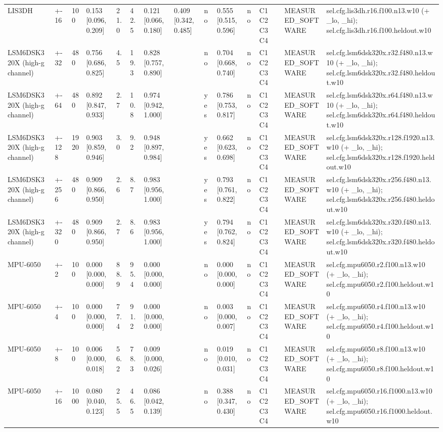 \begin{table}[t]
\begin{tabular}{llllllllllllll}
LIS3DH & +-16 & 100 & 0.153 [0.096, 0.209] & 21.0 & 42.5 & 0.121 [0.066, 0.180] & 0.409 [0.342, 0.485] & no & 0.555 [0.515, 0.596] & no & C1 C2 C3 C4 & MEASURED\_SOFTWARE & sel.cfg.lis3dh.r16.f100.n13.w10 (+ \_lo, \_hi); sel.cfg.lis3dh.r16.f100.heldout.w10 \\
LSM6DSK320X (high-g channel) & +-32 & 480 & 0.756 [0.686, 0.825] & 4.5 & 19.3 & 0.828 [0.757, 0.890] &  & no & 0.704 [0.668, 0.740] & no & C1 C2 C3 C4 & MEASURED\_SOFTWARE & sel.cfg.lsm6dsk320x.r32.f480.n13.w10 (+ \_lo, \_hi); sel.cfg.lsm6dsk320x.r32.f480.heldout.w10 \\
LSM6DSK320X (high-g channel) & +-64 & 480 & 0.892 [0.847, 0.933] & 2.7 & 10.8 & 0.974 [0.942, 1.000] &  & yes & 0.786 [0.753, 0.817] & no & C1 C2 C3 C4 & MEASURED\_SOFTWARE & sel.cfg.lsm6dsk320x.r64.f480.n13.w10 (+ \_lo, \_hi); sel.cfg.lsm6dsk320x.r64.f480.heldout.w10 \\
LSM6DSK320X (high-g channel) & +-128 & 1920 & 0.903 [0.859, 0.946] & 3.0 & 9.2 & 0.948 [0.897, 0.984] &  & yes & 0.662 [0.623, 0.698] & no & C1 C2 C3 C4 & MEASURED\_SOFTWARE & sel.cfg.lsm6dsk320x.r128.f1920.n13.w10 (+ \_lo, \_hi); sel.cfg.lsm6dsk320x.r128.f1920.heldout.w10 \\
LSM6DSK320X (high-g channel) & +-256 & 480 & 0.909 [0.866, 0.950] & 2.6 & 8.7 & 0.983 [0.956, 1.000] &  & yes & 0.793 [0.761, 0.822] & no & C1 C2 C3 C4 & MEASURED\_SOFTWARE & sel.cfg.lsm6dsk320x.r256.f480.n13.w10 (+ \_lo, \_hi); sel.cfg.lsm6dsk320x.r256.f480.heldout.w10 \\
LSM6DSK320X (high-g channel) & +-320 & 480 & 0.909 [0.866, 0.950] & 2.7 & 8.6 & 0.983 [0.956, 1.000] &  & yes & 0.794 [0.762, 0.824] & no & C1 C2 C3 C4 & MEASURED\_SOFTWARE & sel.cfg.lsm6dsk320x.r320.f480.n13.w10 (+ \_lo, \_hi); sel.cfg.lsm6dsk320x.r320.f480.heldout.w10 \\
MPU-6050 & +-2 & 100 & 0.000 [0.000, 0.000] & 88.9 & 95.4 & 0.000 [0.000, 0.000] &  & no & 0.000 [0.000, 0.000] & no & C1 C2 C3 C4 & MEASURED\_SOFTWARE & sel.cfg.mpu6050.r2.f100.n13.w10 (+ \_lo, \_hi); sel.cfg.mpu6050.r2.f100.heldout.w10 \\
MPU-6050 & +-4 & 100 & 0.000 [0.000, 0.000] & 77.4 & 91.2 & 0.000 [0.000, 0.000] &  & no & 0.003 [0.000, 0.007] & no & C1 C2 C3 C4 & MEASURED\_SOFTWARE & sel.cfg.mpu6050.r4.f100.n13.w10 (+ \_lo, \_hi); sel.cfg.mpu6050.r4.f100.heldout.w10 \\
MPU-6050 & +-8 & 100 & 0.006 [0.000, 0.018] & 56.2 & 78.3 & 0.009 [0.000, 0.026] &  & no & 0.019 [0.010, 0.031] & no & C1 C2 C3 C4 & MEASURED\_SOFTWARE & sel.cfg.mpu6050.r8.f100.n13.w10 (+ \_lo, \_hi); sel.cfg.mpu6050.r8.f100.heldout.w10 \\
MPU-6050 & +-16 & 1000 & 0.080 [0.040, 0.123] & 25.5 & 46.5 & 0.086 [0.042, 0.139] &  & no & 0.388 [0.347, 0.430] & no & C1 C2 C3 C4 & MEASURED\_SOFTWARE & sel.cfg.mpu6050.r16.f1000.n13.w10 (+ \_lo, \_hi); sel.cfg.mpu6050.r16.f1000.heldout.w10 \\
\bottomrule
\end{tabular}
\end{table}

